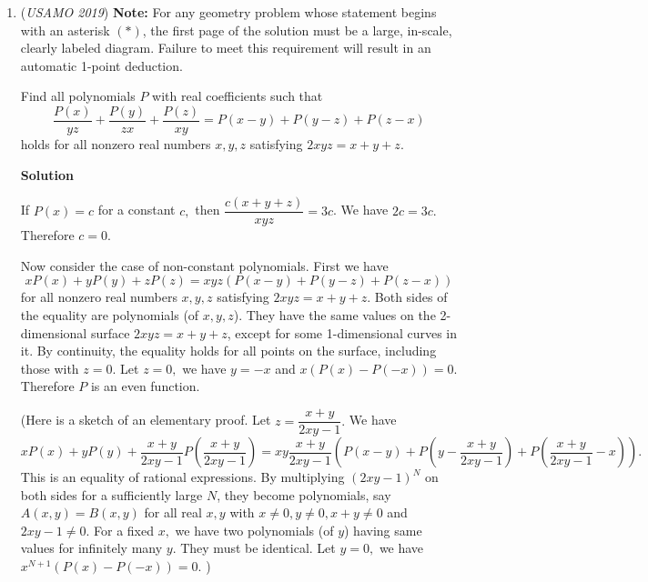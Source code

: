 \begin{enumerate}
 



\textbf{Solution}

We claim that all odd $m, n$ work if $m+n$ is a positive power of 2.

 Proof:We first prove that $m+n=2^k$ works. By weighted averages we have that $\frac{n(\frac{m}{n})+(2^k-n)\frac{n}{m}}{2^k}=\frac{m+n}{2^k}=1$ can be written, so the solution set does indeed work. We will now prove these are the only solutions.

 Assume that $m+n\ne 2^k$, so then $m+n\equiv 0\pmod{p}$ for some odd prime $p$. Then $m\equiv -n\pmod{p}$, so $\frac{m}{n}\equiv \frac{n}{m}\equiv -1\pmod{p}$. We see that the arithmetic mean is $\frac{-1+(-1)}{2}\equiv -1\pmod{p}$ and the harmonic mean is $\frac{2(-1)(-1)}{-1+(-1)}\equiv -1\pmod{p}$, so if 1 can be written then $1\equiv -1\pmod{p}$ and $2\equiv 0\pmod{p}$ which is obviously impossible, and we are done.

 -Stormersyle   

 


	\item (\textit{USAMO 2019}) \textbf{Note:} For any geometry problem whose statement begins with an asterisk $(*)$, the first page of the solution must be a large, in-scale, clearly labeled diagram. Failure to meet this requirement will result in an automatic 1-point deduction.


 Find all polynomials $P$ with real coefficients such that 
 \[\frac{P(x)}{yz}+\frac{P(y)}{zx}+\frac{P(z)}{xy}=P(x-y)+P(y-z)+P(z-x)\]holds for all nonzero real numbers $x,y,z$ satisfying $2xyz=x+y+z$.


 



\textbf{Solution}

If $P(x)=c$ for a constant $c,$ then $\dfrac{c(x+y+z)}{xyz}=3c$. We have $2c=3c.$ Therefore $c=0.$

 Now consider the case of non-constant polynomials. First we have 
 \[xP(x)+yP(y)+zP(z)=xyz(P(x-y)+P(y-z)+P(z-x))\] for all nonzero real numbers $x,y,z$ satisfying $2xyz=x+y+z$. Both sides of the equality are polynomials (of $x,y,z$). They have the same values on the 2-dimensional surface $2xyz=x+y+z$, except for some 1-dimensional curves in it. By continuity, the equality holds for all points on the surface, including those with $z=0.$ Let $z=0,$ we have $y=-x$ and $x(P(x)-P(-x))=0.$ Therefore $P$ is an even function.   

 (Here is a sketch of an elementary proof. Let $z=\dfrac{x+y}{2xy-1}.$ We have
 \[xP(x)+yP(y)+\dfrac{x+y}{2xy-1}P(\dfrac{x+y}{2xy-1})=xy\dfrac{x+y}{2xy-1}(P(x-y)+P(y-\dfrac{x+y}{2xy-1})+P(\dfrac{x+y}{2xy-1}-x)).\]This is an equality of rational expressions. By multiplying $(2xy-1)^N$ on both sides for a sufficiently large $N$, they become polynomials, say $A(x,y)=B(x,y)$ for all real $x, y$ with $x\ne 0, y\ne 0, x+y\ne 0$ and $2xy-1\ne 0.$ For a fixed $x,$ we have two polynomials (of $y$) having same values for infinitely many $y$. They must be identical. Let $y=0,$ we have $x^{N+1}(P(x)-P(-x))=0.$ )


\end{enumerate}
